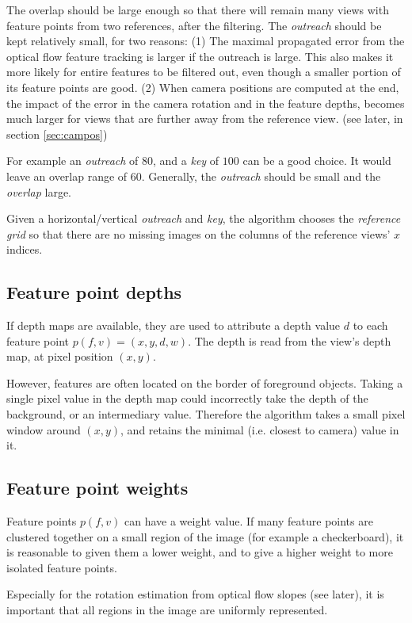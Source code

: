 \documentclass[11pt]{scrreprt}
\begin{document}
The overlap should be large enough so that there will remain many views with feature points from two references, after the filtering. The \emph{outreach} should be kept relatively small, for two reasons: (1) The maximal propagated error from the optical flow feature tracking is larger if the outreach is large. This also makes it more likely for entire features to be filtered out, even though a smaller portion of its feature points are good. (2) When camera positions are computed at the end, the impact of the error in the camera rotation and in the feature depths, becomes much larger for views that are further away from the reference view. (see later, in section \ref{sec:campos})

For example an \emph{outreach} of $80$, and a \emph{key} of $100$ can be a good choice. It would leave an overlap range of $60$. Generally, the \emph{outreach} should be small and the \emph{overlap} large.

Given a horizontal/vertical \emph{outreach} and \emph{key}, the algorithm chooses the \emph{reference grid} so that there are no missing images on the columns of the reference views' $x$ indices.


\subsection{Feature point depths}
If depth maps are available, they are used to attribute a depth value $d$ to each feature point $p(f,v) = (x,y,d,w)$. The depth is read from the view's depth map, at pixel position $(x,y)$.

However, features are often located on the border of foreground objects. Taking a single pixel value in the depth map could incorrectly take the depth of the background, or an intermediary value. Therefore the algorithm takes a small pixel window around $(x,y)$, and retains the minimal (i.e. closest to camera) value in it.



\subsection{Feature point weights}
Feature points $p(f,v)$ can have a weight value. If many feature points are clustered together on a small region of the image (for example a checkerboard), it is reasonable to given them a lower weight, and to give a higher weight to more isolated feature points.

Especially for the rotation estimation from optical flow slopes (see later), it is important that all regions in the image are uniformly represented.
\end{document}
